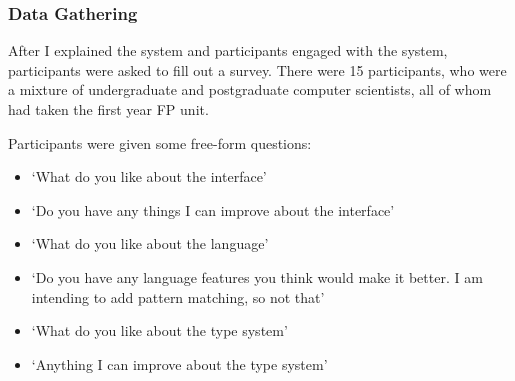 \subsubsection{Data Gathering}
After I explained the system and participants engaged with the system, participants were asked to fill out a survey. There were 15 participants, who were a mixture of undergraduate and postgraduate computer scientists, all of whom had taken the first year \ac{FP} unit. 


    


Participants were given some free-form questions:
\begin{itemize}
    \item `What do you like about the interface'
    \item `Do you have any things I can improve about the interface'
    \item `What do you like about the language'
    \item `Do you have any language features you think would make it better. I am intending to add pattern matching, so not that'
    \item `What do you like about the type system'
    \item `Anything I can improve about the type system'
\end{itemize}

